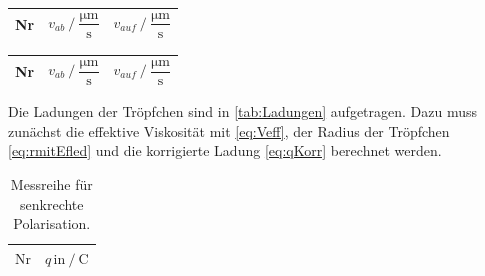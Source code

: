 \begin{table}[H]
\begin{subtable}[t]{0.45\textwidth}
\begin{table}[H]
\begin{tabular}{S S S}
            \bottomrule
          \end{tabular}
        \end{table}
      
  \end{subtable}\qquad
  \begin{subtable}[t]{0.45\textwidth}
      \small
      \label{stab:v225}
      \begin{table}[H]
          \centering
          \begin{tabular}{S S S}
            \toprule
              {Nr}& {$ v_{ab} \mathbin{/} \dfrac{\unit{\micro\meter}}{\unit{\second}}$}&{$ v_{auf} \mathbin{/} \dfrac{\unit{\micro\meter}}{\unit{\second}}$}\\
            \midrule
            
            \bottomrule
          \end{tabular}
        \end{table}
      
  \end{subtable}\qquad
  \begin{subtable}[t]{0.45\textwidth}
      \small
      \label{stab:v250}
      \begin{table}[H]
          \centering
          \begin{tabular}{S S S}
            \toprule
              {Nr}& {$ v_{ab} \mathbin{/} \dfrac{\unit{\micro\meter}}{\unit{\second}}$}&{$ v_{auf} \mathbin{/} \dfrac{\unit{\micro\meter}}{\unit{\second}}$}\\
            \midrule
            
            \bottomrule
          \end{tabular}
        \end{table}
  \end{subtable}
\end{table}

Die Ladungen der Tröpfchen sind in \autoref{tab:Ladungen} aufgetragen. Dazu muss zunächst die effektive Viskosität mit \eqref{eq:Veff}, der Radius der Tröpfchen \eqref{eq:rmitEfled} und die korrigierte Ladung \eqref{eq:qKorr} berechnet werden.

\begin{table}[H]
  \centering
  \caption{Messreihe für senkrechte Polarisation.}
  \label{tab:Ladungen}
  \begin{tabular}{S S}
    \toprule
      {$\text{Nr}$} & {$q \, \text{in} \mathbin{/} \unit{\coulomb}$}\\
    \midrule

    \bottomrule
  \end{tabular}
\end{table}

